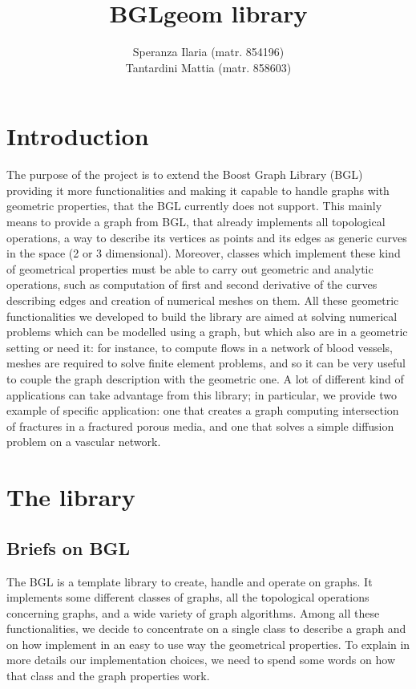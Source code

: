 \documentclass[11pt]{article} %
\title{BGLgeom library}
\author{Speranza Ilaria (matr. 854196) \\ Tantardini Mattia (matr. 858603)}
\begin{document}
\maketitle
\newpage
\tableofcontents
\newpage

\section{Introduction}
	The purpose of the project is to extend the Boost Graph Library (BGL) providing it more functionalities and making it capable to handle graphs with geometric properties, that the BGL currently does not support. This mainly means to provide a graph from BGL, that already implements all topological operations, a way to describe its vertices as points and its edges as generic curves in the space (2 or 3 dimensional). Moreover, classes which implement these kind of geometrical properties must be able to carry out geometric and analytic operations, such as computation of first and second derivative of the curves describing edges and creation of numerical meshes on them. \newline
	All these geometric functionalities we developed to build the library are aimed at solving numerical problems which can be modelled using a graph, but which also are in a geometric setting or need it: for instance, to compute flows in a network of blood vessels, meshes are required to solve finite element problems, and so it can be very useful to couple the graph description with the geometric one. \newline
	A lot of different kind of applications can take advantage from this library; in particular, we provide two example of specific application: one that creates a graph computing intersection of fractures in a fractured porous media, and one that solves a simple diffusion problem on a vascular network.

\section{The library}
	\subsection{Briefs on BGL}
	The BGL is a template library to create, handle and operate on graphs. It implements some different classes of graphs, all the topological operations concerning graphs, and a wide variety of graph algorithms.
	\newline\newline
	Among all these functionalities, we decide to concentrate on a single class to describe a graph and on how implement in an easy to use way the geometrical properties. To explain in more details our implementation choices, we need to spend some words on how that class and the graph properties work.
	
\end{document}
